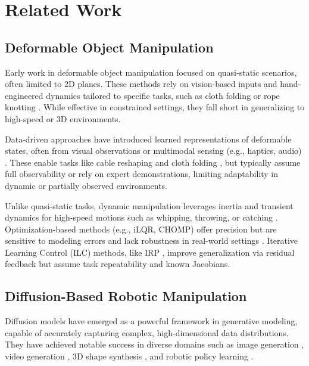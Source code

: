 \documentclass{article}
\begin{document}
\section{Related Work}

\subsection{Deformable Object Manipulation}
Early work in deformable object manipulation focused on quasi-static scenarios, often limited to 2D planes. These methods rely on vision-based inputs and hand-engineered dynamics tailored to specific tasks, such as cloth folding or rope knotting \cite{seita2020deep, hoque2022visuospatial, yin2021modeling}. While effective in constrained settings, they fall short in generalizing to high-speed or 3D environments.

Data-driven approaches have introduced learned representations of deformable states, often from visual observations or multimodal sensing (e.g., haptics, audio) \cite{grannen2021untangling, huang2023self, li2023see}. These enable tasks like cable reshaping and cloth folding \cite{jin2022robotic, xu2022dextairity}, but typically assume full observability or rely on expert demonstrations, limiting adaptability in dynamic or partially observed environments.

Unlike quasi-static tasks, dynamic manipulation leverages inertia and transient dynamics for high-speed motions such as whipping, throwing, or catching \cite{mason1986mechanics, jangir2020dynamic}. Optimization-based methods (e.g., iLQR, CHOMP) offer precision but are sensitive to modeling errors and lack robustness in real-world settings \cite{li2015folding, toussaint2018differentiable}. Iterative Learning Control (ILC) methods, like IRP \cite{chi2024iterative}, improve generalization via residual feedback but assume task repeatability and known Jacobians.


\subsection{Diffusion-Based Robotic Manipulation}
Diffusion models \cite{ho2020denoising} have emerged as a powerful framework in generative modeling, capable of accurately capturing complex, high-dimensional data distributions. They have achieved notable success in diverse domains such as image generation \cite{rombach2022high,peebles2023scalable}, video generation \cite{wang2025lavie,ma2024latte}, 3D shape synthesis \cite{pooledreamfusion}, and robotic policy learning \cite{chi2023diffusion,ze20243d}. 
\end{document}
